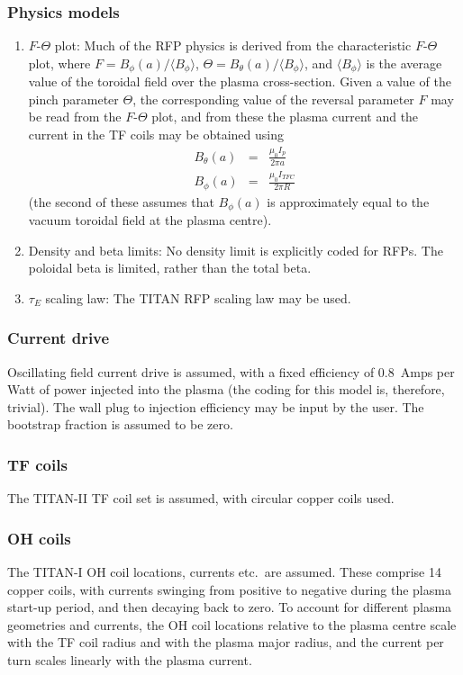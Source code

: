 \documentclass[11pt,a4paper]{report}
\begin{document}
\subsubsection{Physics models}
\begin{enumerate}
\item
$F$-$\Theta$ plot: Much of the RFP physics is derived from the characteristic
$F$-$\Theta$ plot, where $F = B_\phi (a)/\langle B_\phi \rangle$, $\Theta =
B_\theta (a)/\langle B_\phi \rangle$, and $\langle B_\phi \rangle$ is the
average value of the toroidal field over the plasma cross-section. Given a
value of the pinch parameter $\Theta$, the corresponding value of the reversal
parameter $F$ may be read from the $F$-$\Theta$ plot, and from these the plasma
current and the current in the TF coils may be obtained using
\begin{eqnarray*}
B_\theta (a) & = & \frac{\mu_0 I_p}{2\pi a} \\
B_\phi (a)   & = & \frac{\mu_0 I_{TFC}}{2\pi R}
\end{eqnarray*}
(the second of these assumes that $B_\phi (a)$ is approximately equal to the
vacuum toroidal field at the plasma centre).

\item
Density and beta limits: No density limit is explicitly coded for RFPs. The
poloidal beta is limited, rather than the total beta.

\item
$\tau_E$ scaling law: The TITAN RFP scaling law may be used.

\end{enumerate}

\subsubsection{Current drive}
Oscillating field current drive is assumed, with a fixed efficiency of
0.8~Amps per Watt of power injected into the plasma (the coding for this model
is, therefore, trivial). The wall plug to injection efficiency may be
input by the user. The bootstrap fraction is assumed to be zero.

\subsubsection{TF coils}
The TITAN-II TF coil set is assumed, with circular copper coils used.

\subsubsection{OH coils}
The TITAN-I OH coil locations, currents etc.\ are assumed. These comprise 14
copper coils, with currents swinging from positive to negative during the
plasma start-up period, and then decaying back to zero. To account for
different plasma geometries and currents, the OH coil locations relative to
the plasma centre scale with the TF coil radius and with the plasma major
radius, and the current per turn scales linearly with the plasma current.
\end{document}
